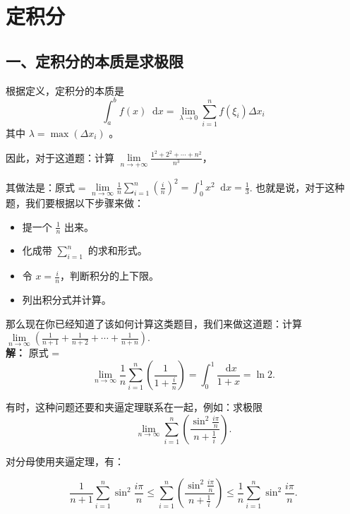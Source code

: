 \documentclass[a5paper]{ctexart}
\renewcommand{\d}{\mathop{}\!\mathrm{d}}
\begin{document}
	\section{定积分}
	
	\subsection*{一、定积分的本质是求极限}
	
	根据定义，定积分的本质是
	\begin{equation*}
		\int_{a}^{b} f(x) \d x = \lim\limits_{\lambda \to 0} \sum_{i = 1}^{n} f(\xi_i) \Delta x_i
	\end{equation*}
	其中 $\lambda = \max(\Delta x_i)$ 。
	
	因此，对于这道题：计算 $\lim\limits_{n \to +\infty} \frac{1^2 +2^2 + \cdots + n^2}{n ^ 3}$，
	
	其做法是：原式 = $\lim\limits_{n \to \infty} \frac{1}{n} \sum \limits_{i = 1}^{n} (\frac{i}{n})^2 = \int_{0}^{1} x^2 \d x = \frac{1}{3}$.
	也就是说，对于这种题，我们要根据以下步骤来做：
	\begin{itemize}
		\item 提一个 $\frac{1}{n}$ 出来。
		\item 化成带 $\sum \limits_{i = 1}^{n}$ 的求和形式。
		\item 令 $x = \frac{i}{n}$，判断积分的上下限。
		\item 列出积分式并计算。
	\end{itemize}
	
	那么现在你已经知道了该如何计算这类题目，我们来做这道题：计算 $\lim\limits_{n \to \infty} (\frac{1}{n + 1} + \frac{1}{n + 2} + \cdots + \frac{1}{n + n})$.\\
	
	\textbf{解：} 原式 = 
	\begin{equation*}
		\lim\limits_{n \to \infty} \frac{1}{n} \sum \limits_{i = 1} ^n(\frac{1}{1 + \frac{i}{n}}) = \int_{0}^{1} \frac{\d x}{1 + x}  = \ln 2.
	\end{equation*}
	
	有时，这种问题还要和夹逼定理联系在一起，例如：求极限
	\begin{equation*}
		\lim\limits_{n \to \infty} \sum_{i = 1}^{n} (\frac{\sin ^2 \frac{i \pi}{n}}{n + \frac{1}{i}}).
	\end{equation*}
   
	对分母使用夹逼定理，有：
	
	\begin{equation*}
		\frac{1}{n + 1} \sum_{i = 1}^{n} \sin ^2 \frac{i \pi}{n} \le \sum_{i = 1}^{n} (\frac{\sin ^2 \frac{i \pi}{n}}{n + \frac{1}{i}}) \le \frac{1}{n} \sum_{i = 1}^{n} \sin ^2 \frac{i \pi}{n}.
	\end{equation*}
	
\end{document}
